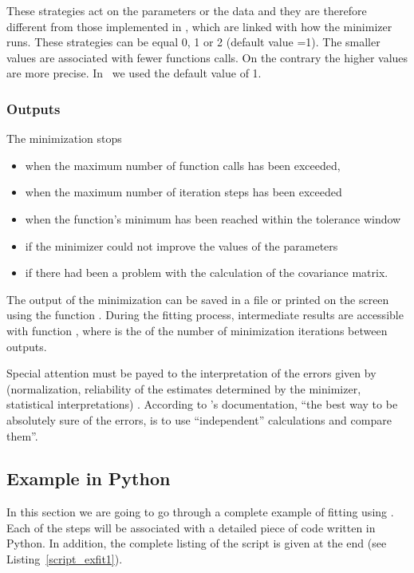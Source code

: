 These strategies act on the parameters or the data and they are
therefore different from those implemented in
 \cite{MinuitURL}, which are linked with how the
minimizer runs. These  strategies can be equal 0, 1 or 2
(default value =1). The smaller values are associated with fewer
functions calls. On the contrary the higher values are more precise. In \BornAgain\ we used the default value of 1.

\subsubsection{Outputs}
The minimization stops 
\begin{itemize}
\item when the maximum number of function calls has been exceeded, 
\item when the maximum number of iteration steps has been exceeded
\item when the function's minimum has been reached within the tolerance window 
\item if the minimizer could not improve the values of
the parameters 
\item if there had been a problem with the calculation of the
  covariance matrix.
\end{itemize}
The output of the minimization can be saved in a file or printed on
the screen using the function . During the
fitting process, intermediate results are accessible with function , where
 is the of the number of
 minimization iterations between outputs.


Special attention must be payed to the
interpretation of the errors given by  (normalization,
reliability of the estimates determined by the minimizer, statistical
interpretations) \cite{minuitv94.1,mnerror}. According to
's documentation, ``the best way to be absolutely sure of the errors, is to use “independent” calculations and compare them''.


\subsection{Example in Python} \label{FittingExample}
In this section we are going to go through a complete example of
fitting using \BornAgain. Each of the steps will be associated with a
detailed piece of code written in Python. In addition, the complete listing of
the script is given at the end (see Listing~\ref{script_exfit1}).\\

